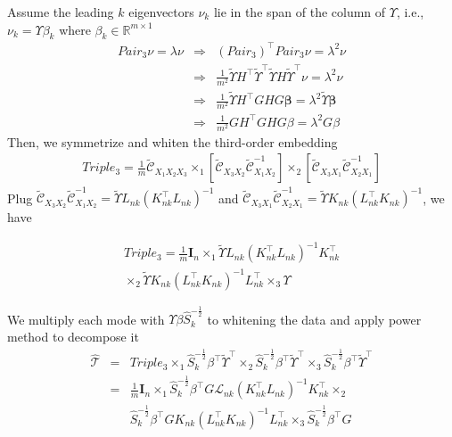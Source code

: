 \documentclass{article}
\begin{document}
Assume the leading $k$ eigenvectors $\nu_k$ lie in the span of the column of $\Upsilon$, i.e., $\nu_k = \Upsilon \beta_k$ where $\beta_k\in \mathbb{R}^{m\times 1}$
%
\begin{eqnarray*}
Pair_3\nu = \lambda \nu &\Rightarrow& (Pair_3)^\top Pair_3\nu = \lambda^2 \nu \\
&\Rightarrow&
\frac{1}{m^2} \widetilde\Upsilon{H}^\top\widetilde\Upsilon^\top\widetilde\Upsilon{H}\widetilde\Upsilon^\top\nu
= \lambda^2\nu \\
&\Rightarrow&
\frac{1}{m^2}\widetilde\Upsilon{H^\top GHG}\bm{\beta} =
\lambda^2 \widetilde\Upsilon\bm{\beta} \\
&\Rightarrow& \frac{1}{m^2}{GH^\top GHG}\beta
= \lambda^2{G}\beta
\end{eqnarray*}
%
Then, we symmetrize and whiten the third-order embedding
%
\begin{eqnarray}
Triple_3 = \frac{1}{m}\widetilde{\mathcal{C}}_{X_1X_2X_3} \times_1
[\widetilde{\mathcal{C}}_{X_3X_2}\widetilde{\mathcal{C}}_{X_1X_2}^{-1}]
\times_2
[\widetilde{\mathcal{C}}_{X_3X_1}\widetilde{\mathcal{C}}_{X_2X_1}^{-1}]
\end{eqnarray}
%
Plug
$\widetilde{\mathcal{C}}_{X_3X_2}\widetilde{\mathcal{C}}_{X_1X_2}^{-1} =
\widetilde\Upsilon{L}_{nk}({K}_{nk}^\top{L}_{nk})^{-1}$
and
$\widetilde{\mathcal{C}}_{X_3X_1}\widetilde{\mathcal{C}}_{X_2X_1}^{-1} =
\widetilde\Upsilon{K}_{nk}({L}_{nk}^\top{K}_{nk})^{-1}$,
we have

\begin{eqnarray*}
Triple_3  = \frac{1}{m}\bm{I}_n \times_1
\widetilde\Upsilon{L}_{nk}({K}_{nk}^\top
{L}_{nk})^{-1}{K}_{nk}^\top\\ \times_2
\widetilde\Upsilon{K}_{nk}({L}_{nk}^\top
{K}_{nk})^{-1}{L}_{nk}^\top \times_3 \Upsilon
\end{eqnarray*}

We multiply each mode with $\Upsilon \beta \widehat{S}_k^{-\frac{1}{2}}$ to
whitening the data and apply power method to decompose it
%
\begin{eqnarray*}
\widehat{\mathcal{T}} &=& Triple_3 \times_1 \widehat{S}_k^{-\frac{1}{2}}\beta^\top\widetilde\Upsilon^\top \times_2
\widehat{S}_k^{-\frac{1}{2}}\beta^\top\widetilde\Upsilon^\top \times_3 \widehat{S}_k^{-\frac{1}{2}}\beta^\top\widetilde\Upsilon^\top\\
&=& \frac{1}{m}\bm{I}_n \times_1
\widehat{S}_k^{-\frac{1}{2}}\beta^\top{G}\mathcal{L}_{nk}({K}_{nk}^\top
{L}_{nk})^{-1}{K}_{nk}^\top \times_2\\
&&\widehat{S}_k^{-\frac{1}{2}}\beta^\top{G}{K}_{nk}({L}_{nk}^\top
{K}_{nk})^{-1}{L}_{nk}^\top \times_3
\widehat{S}_k^{-\frac{1}{2}}\beta^\top{G}
\end{eqnarray*}
%



\end{document}
